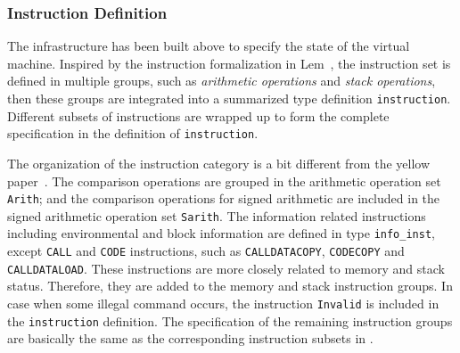 \documentclass[runningheads]{llncs}
\begin{document}
\subsubsection{Instruction Definition}\label{sec:instruction}

The infrastructure has been built above to specify the state of the virtual machine. 
Inspired by the instruction formalization in Lem~\cite{hirai2017defining}, 
the instruction set is defined in multiple groups, such as {\em arithmetic operations} and {\em stack operations}, then these groups are integrated into a summarized type definition \texttt{instruction}. %
Different subsets of instructions are wrapped up to form the complete specification in the definition of \texttt{instruction}.

The organization of the instruction category is a bit different from the yellow paper~\cite{wood2014ethereum}. 
The comparison operations are grouped in the arithmetic operation set \texttt{Arith}; 
and the comparison operations for signed arithmetic are included in the signed arithmetic operation set \texttt{Sarith}. 
The information related instructions including environmental and block information are defined in type \texttt{info\_inst}, 
except \texttt{CALL} and \texttt{CODE} instructions, such as \texttt{CALLDATACOPY}, \texttt{CODECOPY} and \texttt{CALLDATALOAD}. 
These instructions are more closely related to memory and stack status. 
Therefore, they are added to the memory and stack instruction groups. %
In case when some illegal command occurs, the instruction \texttt{Invalid} is included in the \texttt{instruction} definition. 
The specification of the remaining instruction groups are basically the same as the corresponding instruction subsets in \cite{wood2014ethereum}. 
\end{document}
